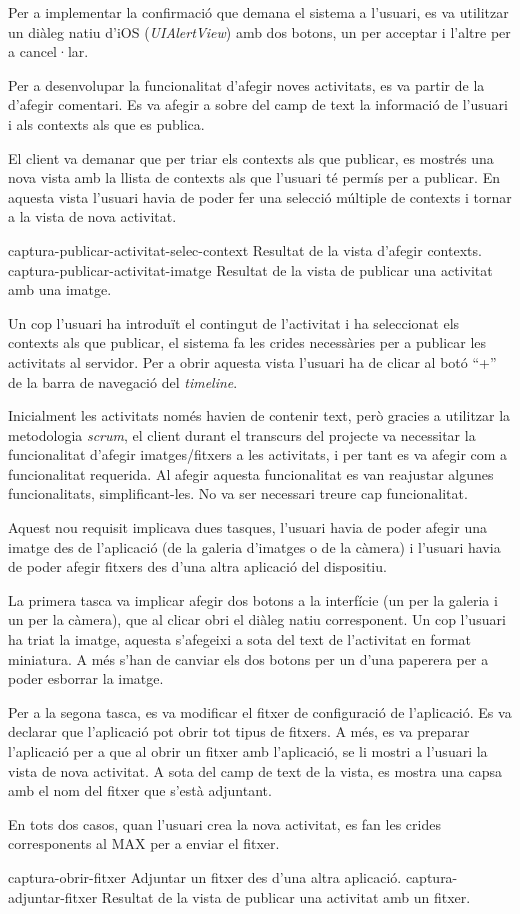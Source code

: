 Per a implementar la confirmació que demana el sistema a l'usuari, es va utilitzar un diàleg natiu d'iOS (\textit{UIAlertView}) amb dos botons, un per acceptar i l'altre per a cancel·lar.

Per a desenvolupar la funcionalitat d'afegir noves activitats, es va partir de la d'afegir comentari. Es va afegir a sobre del camp de text la informació de l'usuari i als contexts als que es publica.

El client va demanar que per triar els contexts als que publicar, es mostrés una nova vista amb la llista de contexts als que l'usuari té permís per a publicar. En aquesta vista l'usuari havia de poder fer una selecció múltiple de contexts i tornar a la vista de nova activitat.


\pintaDosImatges
    {captura-publicar-activitat-selec-context}
        {Resultat de la vista d'afegir contexts.}
    {captura-publicar-activitat-imatge}
        {Resultat de la vista de publicar una activitat amb una imatge.}

Un cop l'usuari ha introduït el contingut de l'activitat i ha seleccionat els contexts als que publicar, el sistema fa les crides necessàries per a publicar les activitats al servidor.
Per a obrir aquesta vista l'usuari ha de clicar al botó ``+'' de la barra de navegació del \textit{timeline}.

Inicialment les activitats només havien de contenir text, però gracies a utilitzar la metodologia \textit{scrum}, el client durant el transcurs del projecte va necessitar la funcionalitat d'afegir imatges/fitxers a les activitats, i per tant es va afegir com a funcionalitat requerida. Al afegir aquesta funcionalitat es van reajustar algunes funcionalitats, simplificant-les. No va ser necessari treure cap funcionalitat.

Aquest nou requisit implicava dues tasques, l'usuari havia de poder afegir una imatge des de l'aplicació (de la galeria d'imatges o de la càmera) i l'usuari havia de poder afegir fitxers des d'una altra aplicació del dispositiu. 

La primera tasca va implicar afegir dos botons a la interfície (un per la galeria i un per la càmera), que al clicar obri el diàleg natiu corresponent. Un cop l'usuari ha triat la imatge, aquesta s'afegeixi a sota del text de l'activitat en format miniatura. A més s'han de canviar els dos botons per un d'una paperera per a poder esborrar la imatge.

Per a la segona tasca, es va modificar el fitxer de configuració de l'aplicació. Es va declarar que l'aplicació pot obrir tot tipus de fitxers. A més, es va preparar l'aplicació per a que al obrir un fitxer amb l'aplicació, se li mostri a l'usuari la vista de nova activitat. A sota del camp de text de la vista, es mostra una capsa amb el nom del fitxer que s'està adjuntant.

En tots dos casos, quan l'usuari crea la nova activitat, es fan les crides corresponents al MAX per a enviar el fitxer.


\pintaDosImatges
    {captura-obrir-fitxer}
        {Adjuntar un fitxer des d'una altra aplicació.}
    {captura-adjuntar-fitxer}
        {Resultat de la vista de publicar una activitat amb un fitxer.}
\clearpage



